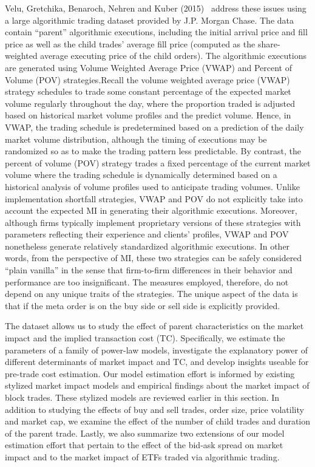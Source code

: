 Velu, Gretchika, Benaroch, Nehren and Kuber (2015)~\cite{unpub} address these issues using a large algorithmic trading dataset provided by J.P. Morgan Chase. The data contain ``parent'' algorithmic executions, including the initial arrival price and fill price as well as the child trades' average fill price (computed as the share-weighted average executing price of the child orders). The algorithmic executions are generated using Volume Weighted Average Price (VWAP) and Percent of Volume (POV) strategies.Recall the volume weighted average price (VWAP) strategy schedules to trade some constant percentage of the expected market volume regularly throughout the day, where the proportion traded is adjusted based on historical market volume profiles and the predict volume. Hence, in VWAP, the trading schedule is predetermined based on a prediction of the daily market volume distribution, although the timing of executions may be randomized so as to make the trading pattern less predictable. By contrast, the percent of volume (POV) strategy trades a fixed percentage of the current market volume where the trading schedule is dynamically determined based on a historical analysis of volume profiles used to anticipate trading volumes. Unlike implementation shortfall strategies, VWAP and POV do not explicitly take into account the expected MI in generating their algorithmic executions. Moreover, although firms typically implement proprietary versions of these strategies with parameters reflecting their experience and clients' profiles, VWAP and POV nonetheless generate relatively standardized algorithmic executions. In other words, from the perspective of MI, these two strategies can be safely considered ``plain vanilla'' in the sense that firm-to-firm differences in their behavior and performance are too insignificant. The measures employed, therefore, do not depend on any unique traits of the strategies. The unique aspect of the data is that if the meta order is on the buy side or sell side is explicitly provided. 


The dataset allows us to study the effect of parent characteristics on the market impact and the implied transaction cost (TC). Specifically, we estimate the parameters of a family of power-law models, investigate the explanatory power of different determinants of market impact and TC, and develop insights useable for pre-trade cost estimation. Our model estimation effort is informed by existing stylized market impact models and empirical findings about the market impact of block trades. These stylized models are reviewed earlier in this section. In addition to studying the effects of buy and sell trades, order size, price volatility and market cap, we examine the effect of the number of child trades and duration of the parent trade. Lastly, we also summarize two extensions of our model estimation effort that pertain to the effect of the bid-ask spread on market impact and to the market impact of ETFs traded via algorithmic trading.


